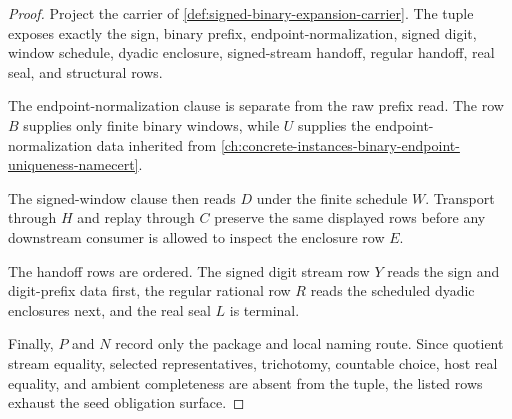 \begin{proof}
Project the carrier of \autoref{def:signed-binary-expansion-carrier}. The tuple exposes exactly the sign, binary prefix, endpoint-normalization, signed digit, window schedule, dyadic enclosure, signed-stream handoff, regular handoff, real seal, and structural rows.

The endpoint-normalization clause is separate from the raw prefix read. The row $B$ supplies only finite binary windows, while $U$ supplies the endpoint-normalization data inherited from \autoref{ch:concrete-instances-binary-endpoint-uniqueness-namecert}.

The signed-window clause then reads $D$ under the finite schedule $W$. Transport through $H$ and replay through $C$ preserve the same displayed rows before any downstream consumer is allowed to inspect the enclosure row $E$.

The handoff rows are ordered. The signed digit stream row $Y$ reads the sign and digit-prefix data first, the regular rational row $R$ reads the scheduled dyadic enclosures next, and the real seal $L$ is terminal.

Finally, $P$ and $N$ record only the package and local naming route. Since quotient stream equality, selected representatives, trichotomy, countable choice, host real equality, and ambient completeness are absent from the tuple, the listed rows exhaust the seed obligation surface.
\end{proof}

